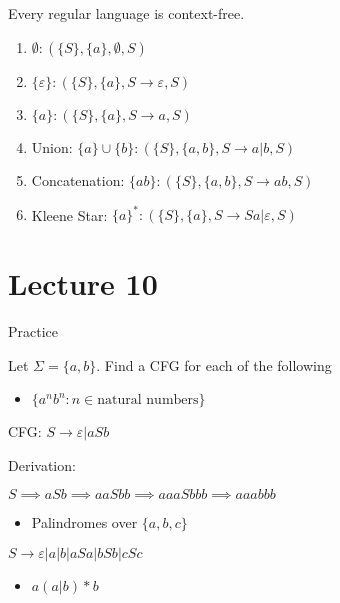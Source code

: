 \documentclass{article}
\begin{document}


Every regular language is context-free.

\begin{enumerate}
\def\labelenumi{\arabic{enumi}.}
\item
  \(\emptyset: (\{S\}, \{a\}, \emptyset, S)\)
\item
  \(\{\varepsilon\}: (\{S\}, \{a\}, S \to \varepsilon, S)\)
\item
  \(\{a\}: (\{S\}, \{a\}, S \to a, S)\)
\item
  Union: \(\{a\} \cup \{b\}: (\{S\}, \{a, b\}, S \to a | b, S)\)
\item
  Concatenation: \(\{ab\}: (\{S\}, \{a,b\}, S \to ab, S)\)
\item
  Kleene Star: \(\{a\}^*: (\{S\}, \{a\}, S \to Sa | \varepsilon, S)\)
\end{enumerate}

\section{Lecture 10}\label{lecture-10}

Practice

Let \(\Sigma = \{a,b\}\). Find a CFG for each of the following

\begin{itemize}

\item
  \(\{a^n b^n: n \in \text{natural numbers}\}\)
\end{itemize}

CFG: \(S \to \varepsilon | aSb\)

Derivation:

\(S \implies aSb \implies aaSbb \implies aaaSbbb \implies aaabbb\)

\begin{itemize}

\item
  Palindromes over \(\{a,b,c\}\)
\end{itemize}

\(S \to \varepsilon | a | b | aSa | bSb | cSc\)

\begin{itemize}

\item
  \(a(a | b) * b\)
\end{itemize}
\end{document}
